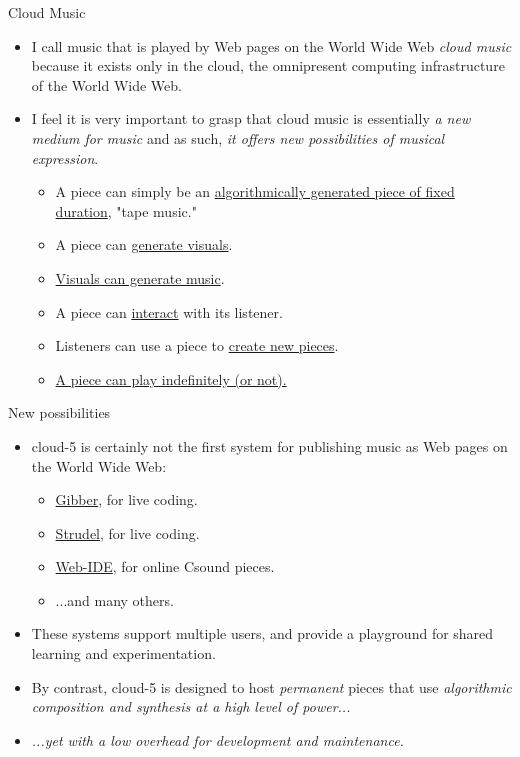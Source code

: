 \documentclass{beamer}
\begin{document}
\begin{frame}{Cloud Music}
\begin{itemize}
\item I call music that is played by Web pages on the World Wide Web \emph{cloud music} because it exists only in the cloud, the omnipresent computing infrastructure of the World Wide Web.
\item I feel it is very important to grasp that cloud music is essentially \emph{a new medium for music} and as such,\emph{ it offers new possibilities of musical expression}.
\begin{itemize}
\item A piece can simply be an \href{http://localhost:8000/cloud5-example-score-generator.html}{algorithmically generated piece of fixed duration}, "tape music."
\item A piece can \href{http://localhost:8000/cloud_music_no_2.html}{generate visuals}.
\item \href{http://localhost:8000/cloud_music_no_1.html}{Visuals can generate music}.
\item A piece can \href{http://localhost:8000/cloud5-example-visual-music.html}{interact} with its listener.
\item Listeners can use a piece to \href{http://localhost:8000/cancycle.html}{create new pieces}.
\item \href{http://localhost:8000/cancycle.html}{A piece can play indefinitely (or not).}
\end{itemize}
\end{itemize}
\end{frame}

\begin{frame}{New possibilities}
\begin{itemize}
\item cloud-5 is certainly not the first system for publishing music as Web pages on the World Wide Web:
\begin{itemize}
\item \href{https://gibber.cc/playground/}{Gibber}, for live coding.
\item \href{https://strudel.cc/}{Strudel}, for live coding.
\item \href{https://ide.csound.com/}{Web-IDE}, for online Csound pieces.
\item ...and many others.
\end{itemize}
\item These systems support multiple users, and provide a playground for shared learning and experimentation.
\item By contrast, cloud-5 is designed to host \emph{permanent} pieces that use \emph{algorithmic composition and synthesis at a high level of power...}
\item\emph{ ...yet with a low overhead for development and maintenance.}
\end{itemize}
\end{frame}
\end{document}
